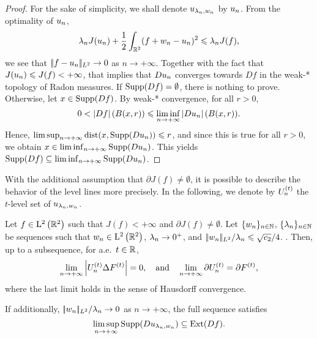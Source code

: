 \begin{proof}
 For the sake of simplicity, we shall denote $u_{\lambda_n,w_n}$ by $u_{n}$. 
From the optimality of $u_{n}$, 
  \begin{equation*}
    \lambda_n J(u_{n})+\frac{1}{2}\int_{\mathbb{R}^2}(f+w_n-u_{n})^2 \leqslant \lambda_n J(f),
  \end{equation*}
  we see that $|\!| f-u_{n} |\!|_{L^2}\to 0$ as $n\to+\infty$. Together with the fact that $J(u_{n})\leqslant J(f)<+\infty$, that implies that $Du_{n}$ converges towards $Df$ in the weak-* topology of Radon measures. 
If $\operatorname{Supp}(Df)=\emptyset$, there is nothing to prove. Otherwise, let $x\in \operatorname{Supp}(Df)$. By weak-* convergence, for all $r>0$,
\begin{equation*}
0<\left| Df \right|(B(x,r))\leqslant \liminf_{n\to+\infty} \left| Du_{n} \right|(B(x,r)).
\end{equation*}
Hence,  $\limsup_{n\to +\infty}\mathrm{dist}(x,\operatorname{Supp}(Du_{n}))\leqslant r$, and since this is true for all $r>0$, we obtain $x\in \liminf_{n\to+\infty} \operatorname{Supp}(Du_{n})$. This yields $\operatorname{Supp}(Df)\subseteq \liminf_{n\to +\infty} \operatorname{Supp}(Du_{n})$.
\end{proof}

With the additional assumption that $\partial J(f)\neq \emptyset$, it is possible to describe the behavior of the level lines more precisely. In the following, we denote by $U_n^{(t)}$ the $t$-level set of $u_{\lambda_n,w_n}$.

\begin{thm}\label{thm:spt_stability}
  Let $f\in \mathrm{L}^2\left(\mathbb{R}^2\right)$ such that $J(f)<+\infty$ and $\partial J(f)\neq \emptyset$.
  Let $\{w_n\}_{n\in\mathbb{N}}$, $\{\lambda_n\}_{n\in\mathbb{N}}$ be sequences such that $w_n\in \mathrm{L}^2\left(\mathbb{R}^2\right)$, $\lambda_n\to 0^+$, and ${|\!| w_n |\!|_{L^2}}/{\lambda_n}\leqslant \sqrt{c_2}/4$. .
  Then, up to a subsequence, for a.e.\ $t\in \mathbb{R}$,
  \begin{align}\label{eq:limt}
 \lim_{n\to+\infty} \left| U_n^{(t)}\Delta F^{(t)} \right| =0,\quad \text{and} \quad \lim_{n\to+\infty} \partial U_n^{(t)}=\partial F^{(t)},
\end{align}
where the last limit holds in the sense of Hausdorff convergence.

If additionally, ${|\!| w_n |\!|_{L^2}}/{\lambda_n}\to 0$ as $n\to +\infty$, the full sequence satisfies
\begin{equation}\label{eq:suppliminfsup}
  \limsup_{n\to+\infty} \operatorname{Supp}(Du_{\lambda_n,w_n})\subseteq \operatorname{Ext}(Df).
\end{equation}
\end{thm}

